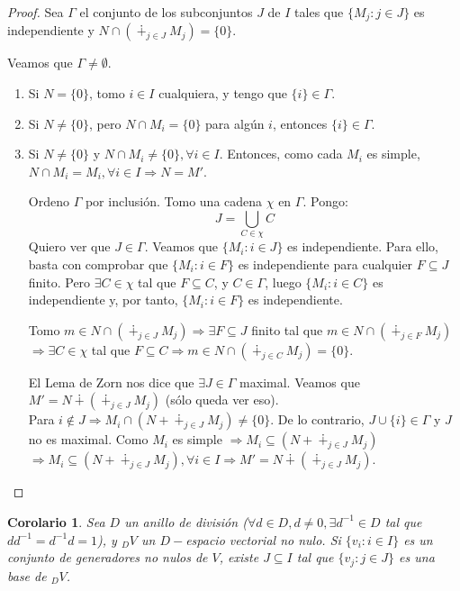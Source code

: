 \documentclass[11pt,a4paper]{article}
\theoremstyle{break}
\newtheorem{corollary}[theorem]{Corolario}
\begin{document}
\begin{proof}
Sea $\Gamma$ el conjunto de los subconjuntos $J$ de $I$ tales que $\{M_{j}: j \in J\}$ es independiente y $N \cap (\dotplus_{j \in J} M_{j}) = \{0\}$.

Veamos que $\Gamma \neq \emptyset$.
\begin{enumerate}
\item Si $N = \{0\}$, tomo $i \in I$ cualquiera, y tengo que $\{i\} \in \Gamma$.
\item Si $N \neq \{0\}$, pero $N \cap M_{i} = \{0\}$ para algún $i$, entonces $\{i\} \in \Gamma$.
\item Si $N \neq \{0\}$ y $N \cap M_{i} \neq \{0\}, \forall i \in I$. Entonces, como cada $M_{i}$ es simple, $N \cap M_{i} = M_{i}, \forall i \in I \Rightarrow N = M'$.

Ordeno $\Gamma$ por inclusión. Tomo una cadena $\chi$ en $\Gamma$. Pongo:
$$J = \bigcup_{C \in \chi} C$$
Quiero ver que $J \in \Gamma$. Veamos que $\{M_{i}: i \in J\}$ es independiente. Para ello, basta con comprobar que $\{M_{i}: i \in F\}$ es independiente para cualquier $F \subseteq J$ finito. Pero $\exists C \in \chi$ tal que $F \subseteq C$, y $C \in \Gamma$, luego $\{M_{i}: i \in C\}$ es independiente y, por tanto, $\{M_{i}: i \in F\}$ es independiente.

Tomo $m \in N \cap (\dotplus_{j \in J} M_{j}) \Rightarrow \exists F \subseteq J$ finito tal que $m \in N \cap (\dotplus_{j \in F} M_{j})$ \\ $\Rightarrow \exists C \in \chi$ tal que $F \subseteq C \Rightarrow m \in N \cap (\dotplus_{j \in C} M_{j}) = \{0\}$.

El Lema de Zorn nos dice que $\exists J \in \Gamma$ maximal. Veamos que $M' = N \dotplus(\dotplus_{j \in J} M_{j})$ (sólo queda ver eso). \\
Para $i \notin J \Rightarrow M_{i} \cap (N + \dotplus_{j \in J} M_{j}) \neq \{0\}$. De lo contrario, $J \cup \{i\} \in \Gamma$ y $J$ no es maximal. Como $M_{i}$ es simple $\Rightarrow M_{i} \subseteq (N + \dotplus_{j \in J} M_{j})$ \\ $\Rightarrow M_{i} \subseteq (N + \dotplus_{j \in J} M_{j}), \forall i \in I \Rightarrow M' = N \dotplus (\dotplus_{j \in J} M_{j})$.
\end{enumerate}
\end{proof}

\begin{corollary}
Sea $D$ un anillo de división ($\forall d \in D, d \neq 0, \exists d^{-1} \in D$ tal que $dd^{-1} = d^{-1}d = 1$), y $_{D}V$ un $D-$espacio vectorial no nulo. Si $\{v_{i}: i \in I\}$ es un conjunto de generadores no nulos de $V$, existe $J \subseteq I$ tal que $\{v_{j}: j \in J\}$ es una base de $_{D}V$.
\end{corollary}
\end{document}
